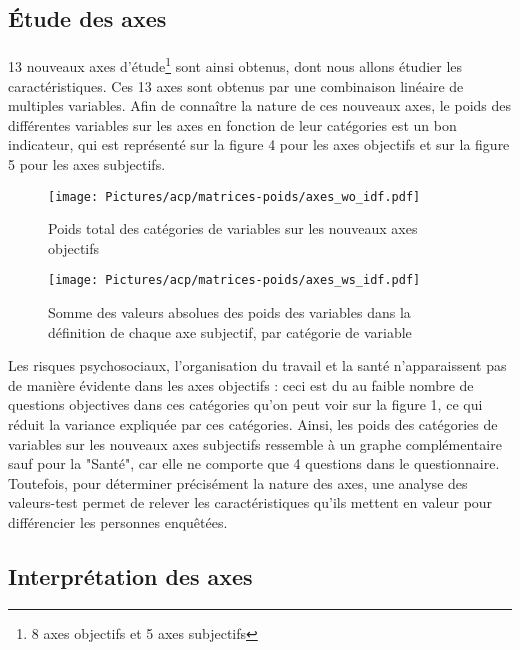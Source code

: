 \documentclass[11pt,fleqn,a4paper,openany,frenchb]{book} %
\begin{document}
\subsection{\'Etude des axes }
\paragraph{}
13 nouveaux axes d'étude\footnote{8 axes objectifs et 5 axes subjectifs} sont ainsi obtenus, dont nous allons étudier les caractéristiques. Ces 13 axes sont obtenus par une combinaison linéaire de multiples variables. Afin de connaître la nature de ces nouveaux axes, le poids des différentes variables sur les axes en fonction de leur catégories est un bon indicateur, qui est représenté sur la figure 4 pour les axes objectifs et sur la figure 5 pour les axes subjectifs. 
\begin{figure}[!h]
    \centering
  \texttt{[image: Pictures/acp/matrices-poids/axes\_wo\_idf.pdf]}
    \caption{Poids total des catégories de variables sur les nouveaux axes objectifs}
    \label{fig:ACPobj}
\end{figure}


\begin{figure}[!h]
  \centering
  \texttt{[image: Pictures/acp/matrices-poids/axes\_ws\_idf.pdf]}
  \caption{Somme des valeurs absolues des poids des variables dans la définition de chaque axe subjectif, par catégorie de variable}
  \label{fig:ACPsubj}
\end{figure}

Les risques psychosociaux, l'organisation du travail et la santé n'apparaissent pas de manière évidente dans les axes objectifs : ceci est du au faible nombre de questions objectives dans ces catégories qu'on peut voir sur la figure 1, ce qui réduit la variance expliquée par ces catégories. Ainsi, les poids des catégories de variables sur les nouveaux axes subjectifs ressemble à un graphe complémentaire sauf pour la "Santé", car elle ne comporte que 4 questions dans le questionnaire. Toutefois, pour déterminer précisément la nature des axes, une analyse des valeurs-test permet de relever les caractéristiques qu'ils mettent en valeur pour différencier les personnes enquêtées.%

\subsection{Interprétation des axes}
\end{document}

